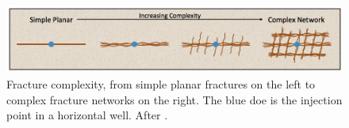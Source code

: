 \begin{figure}
    \begin{center}
    \includegraphics[width=\columnwidth]{figures/phys_prop_model/frac_complexity.png}
    \end{center}
\caption{
    Fracture complexity, from simple planar fractures on the left to complex fracture
    networks on the right. The blue doe is the injection point in a horizontal well. After \cite{Cipolla2008a}.
}
\label{fig:frac_complexity}
\end{figure}
